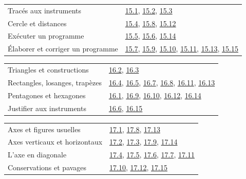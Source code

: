 \begin{tabularx}{\linewidth}{@{}Yl@{}}\toprule
Tracés aux instruments & \hyperref[exo-15-1]{15.1}, \hyperref[exo-15-2]{15.2}, \hyperref[exo-15-3]{15.3}\\[2mm]
Cercle et distances & \hyperref[exo-15-4]{15.4}, \hyperref[exo-15-8]{15.8}, \hyperref[exo-15-12]{15.12}\\[2mm]
Exécuter un programme & \hyperref[exo-15-5]{15.5}, \hyperref[exo-15-6]{15.6}, \hyperref[exo-15-14]{15.14}\\[2mm]
Élaborer et corriger un programme & \hyperref[exo-15-7]{15.7}, \hyperref[exo-15-9]{15.9}, \hyperref[exo-15-10]{15.10}, \hyperref[exo-15-11]{15.11}, \hyperref[exo-15-13]{15.13}, \hyperref[exo-15-15]{15.15}\\[2mm]
\bottomrule\end{tabularx}\par\vspace{4mm}
\clearpage
{}\fontsize{10}{13}\selectfont
{}\begin{tabularx}{\linewidth}{@{}Yl@{}}\toprule
Triangles et constructions & \hyperref[exo-16-2]{16.2}, \hyperref[exo-16-3]{16.3}\\[2mm]
Rectangles, losanges, trapèzes & \hyperref[exo-16-4]{16.4}, \hyperref[exo-16-5]{16.5}, \hyperref[exo-16-7]{16.7}, \hyperref[exo-16-8]{16.8}, \hyperref[exo-16-11]{16.11}, \hyperref[exo-16-13]{16.13}\\[2mm]
Pentagones et hexagones & \hyperref[exo-16-1]{16.1}, \hyperref[exo-16-9]{16.9}, \hyperref[exo-16-10]{16.10}, \hyperref[exo-16-12]{16.12}, \hyperref[exo-16-14]{16.14}\\[2mm]
Justifier aux instruments & \hyperref[exo-16-6]{16.6}, \hyperref[exo-16-15]{16.15}\\[2mm]
\bottomrule\end{tabularx}\par\vspace{4mm}
\begin{tabularx}{\linewidth}{@{}Yl@{}}\toprule
Axes et figures usuelles & \hyperref[exo-17-1]{17.1}, \hyperref[exo-17-8]{17.8}, \hyperref[exo-17-13]{17.13}\\[2mm]
Axes verticaux et horizontaux & \hyperref[exo-17-2]{17.2}, \hyperref[exo-17-3]{17.3}, \hyperref[exo-17-9]{17.9}, \hyperref[exo-17-14]{17.14}\\[2mm]
L’axe en diagonale & \hyperref[exo-17-4]{17.4}, \hyperref[exo-17-5]{17.5}, \hyperref[exo-17-6]{17.6}, \hyperref[exo-17-7]{17.7}, \hyperref[exo-17-11]{17.11}\\[2mm]
Conservations et pavages & \hyperref[exo-17-10]{17.10}, \hyperref[exo-17-12]{17.12}, \hyperref[exo-17-15]{17.15}\\[2mm]
\bottomrule\end{tabularx}\par\vspace{4mm}
